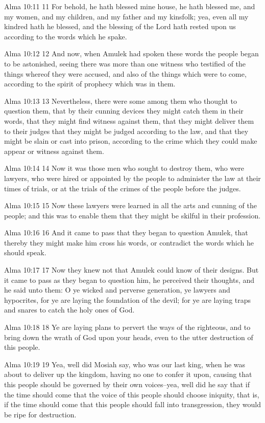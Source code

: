 Alma 10:11
 11 For behold, he hath blessed mine house, he hath blessed me,
and my women, and my children, and my father and my kinsfolk;
yea, even all my kindred hath he blessed, and the blessing of the
Lord hath rested upon us according to the words which he spake.

Alma 10:12
 12 And now, when Amulek had spoken these words the people began
to be astonished, seeing there was more than one witness who
testified of the things whereof they were accused, and also of
the things which were to come, according to the spirit of
prophecy which was in them.

Alma 10:13
 13 Nevertheless, there were some among them who thought to
question them, that by their cunning devices they might catch
them in their words, that they might find witness against them,
that they might deliver them to their judges that they might be
judged according to the law, and that they might be slain or cast
into prison, according to the crime which they could make appear
or witness against them.

Alma 10:14
 14 Now it was those men who sought to destroy them, who were
lawyers, who were hired or appointed by the people to administer
the law at their times of trials, or at the trials of the crimes
of the people before the judges.

Alma 10:15
 15 Now these lawyers were learned in all the arts and cunning of
the people; and this was to enable them that they might be
skilful in their profession.

Alma 10:16
 16 And it came to pass that they began to question Amulek, that
thereby they might make him cross his words, or contradict the
words which he should speak.

Alma 10:17
 17 Now they knew not that Amulek could know of their designs.
But it came to pass as they began to question him, he perceived
their thoughts, and he said unto them: O ye wicked and perverse
generation, ye lawyers and hypocrites, for ye are laying the
foundation of the devil; for ye are laying traps and snares to
catch the holy ones of God.

Alma 10:18
 18 Ye are laying plans to pervert the ways of the righteous, and
to bring down the wrath of God upon your heads, even to the utter
destruction of this people.

Alma 10:19
 19 Yea, well did Mosiah say, who was our last king, when he was
about to deliver up the kingdom, having no one to confer it upon,
causing that this people should be governed by their own
voices--yea, well did he say that if the time should come that
the voice of this people should choose iniquity, that is, if the
time should come that this people should fall into transgression,
they would be ripe for destruction.

